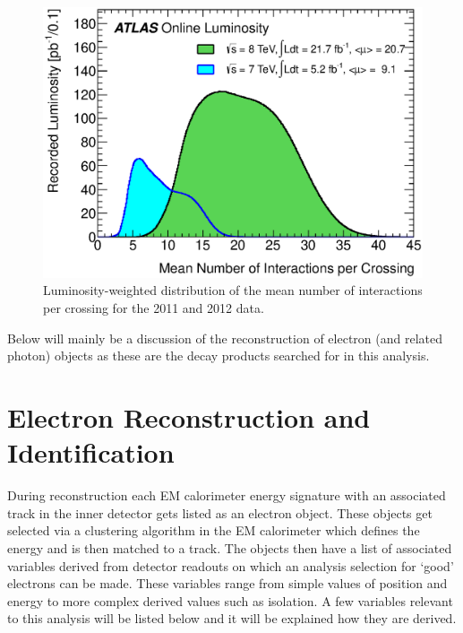 \begin{figure}[h!]
	\centering
		\includegraphics[width=0.8\linewidth]{images/mu_2011_2012-dec.eps}
	\caption{Luminosity-weighted distribution of the mean number of interactions per crossing for the 2011 and 2012 data. \cite{mu_2011_2012_dec,Aad:2011dr}}
	\label{fig:pu}
\end{figure}


Below will mainly be a discussion of the reconstruction of electron (and related photon) objects as these are the decay products searched for in this analysis.



\section{Electron Reconstruction and Identification}
\label{sec:ReconElec}

	During reconstruction each EM calorimeter energy signature with an associated track in the inner detector gets listed as an electron object. These objects get selected via a clustering algorithm in the EM calorimeter which defines the energy and is then matched to a track. The objects then have a list of associated variables derived from detector readouts on which an analysis selection for `good' electrons can be made. These variables range from simple values of position and energy to more complex derived values such as isolation. A few variables relevant to this analysis will be listed below and it will be explained how they are derived.

